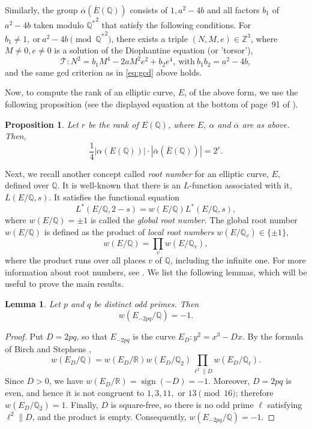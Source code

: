 \documentclass[12pt]{amsart}
\newcommand{\bbQ}{\mathbb{Q}}
\newcommand{\bbR}{\mathbb{R}}
\newcommand{\bbZ}{\mathbb{Z}}
\newcommand{\cT}{\mathcal{T}}
\DeclareMathOperator{\sgn}{sign}
\numberwithin{equation}{section}
\newtheorem{lem}{Lemma}[section]
\newtheorem{proposition}[theorem]{Proposition}
\theoremstyle{definition}
\begin{document}
Similarly, the group $\overline{\alpha} \left( \overline{E}(\bbQ) \right)$
consists of $1, a^{2}-4b$ and all factors $b_{1}$ of $a^{2}-4b$ taken modulo
${\bbQ^{*}}^{2}$ that satisfy the following conditions.
For $b_{1} \neq 1, ~\text{or}~ a^{2}-4b \pmod{{\bbQ^{*}}^{2}}$,
there exists a triple $(N, M, e) \in \bbZ^{3}$,
where $M \neq 0, e \neq 0$ is a solution of the Diophantine equation (or 'torsor'),
\[
\overline{\cT}: N^{2} = b_{1} M^{4} -2a M^{2} e^{2} + b_{2} e^{4}, ~\text{with}~  b_{1} b_{2} =a^{2}-4b,
\]
and the same gcd criterion as in \eqref{eq:gcd} above holds.

Now, to compute the rank of an elliptic curve, $E$, of the above form, we use the
following proposition (see the displayed equation at the bottom of page~91 of
\cite{ST15}).

\begin{proposition}
\label{prop:2.1}
Let $r$ be the rank of $E(\bbQ)$, where $E$, $\alpha$ and $\overline{\alpha}$
are as above. Then,
\[
\frac{1}{4} |\alpha(E(\bbQ))| \cdot \left| \overline{\alpha} \left( \overline{E}(\bbQ) \right) \right|
= 2^{r}.
\]
\end{proposition}
Next, we recall another concept called {\it root number}  for an elliptic curve, $E$, defined over $\bbQ$. It is well-known that there is an $L$-function associated with it, $L(E/\bbQ,s)$. It satisfies the functional equation
\[
L^{*}(E/\bbQ,2-s)=w(E/\bbQ)L^{*}(E/\bbQ,s),
\]
where $w(E/\bbQ)=\pm 1$ is called the \emph{global root number}. The global root number $w(E/\bbQ)$ is defined as the product of \emph{local root numbers}
$w \left( E/\bbQ_{v} \right) \in \{ \pm 1 \}$,
\[
w(E/\bbQ) = \prod_{v} w \left( E/\bbQ_{v} \right),
\]
where the product runs over all places $v$ of $\bbQ$, including the infinite one.
For more information about root numbers, see \cite{CK-D}. We list the following lemmas, which will be useful to prove the main results.


\begin{lem}
\label{lem:root}
Let $p$ and $q$ be distinct odd primes. Then
\[
w\left(E_{-2pq}/\bbQ\right)=-1.
\]
\end{lem}

\begin{proof}
Put $D=2pq$, so that $E_{-2pq}$ is the curve $E_D:y^2=x^3-Dx$.
By the formula of Birch and Stephens \cite[(9) and (10), p.~296]{B-S},
\[
w(E_D/\bbQ)=w(E_D/\bbR)w(E_D/\bbQ_2)
\prod_{\ell^2\parallel D}w(E_D/\bbQ_\ell).
\]
Since $D>0$, we have $w(E_D/\bbR)=\sgn(-D)=-1$. Moreover,
$D=2pq$ is even, and hence it is not congruent to
$1,3,11,$ or $13\pmod{16}$; therefore $w(E_D/\bbQ_2)=1$.
Finally, $D$ is square-free, so there is no odd prime $\ell$ satisfying
$\ell^2\parallel D$, and the product is empty. Consequently,
$w(E_{-2pq}/\bbQ)=-1$.
\end{proof}
\end{document}
